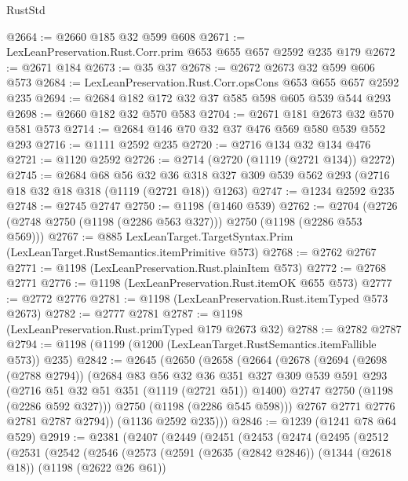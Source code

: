 \begin{lexlean}{RustStd}
\begin{coremodule}
@2664 := @2660 @185 @32 @599 @608
@2671 := LexLeanPreservation.Rust.Corr.prim @653 @655 @657 @2592 @235 @179
@2672 := @2671 @184
@2673 := @35 @37
@2678 := @2672 @2673 @32 @599 @606 @573
@2684 := LexLeanPreservation.Rust.Corr.opsCons @653 @655 @657 @2592 @235
@2694 := @2684 @182 @172 @32 @37 @585 @598 @605 @539 @544 @293
@2698 := @2660 @182 @32 @570 @583
@2704 := @2671 @181 @2673 @32 @570 @581 @573
@2714 := @2684 @146 @70 @32 @37 @476 @569 @580 @539 @552 @293
@2716 := @1111 @2592 @235
@2720 := @2716 @134 @32 @134 @476
@2721 := @1120 @2592
@2726 := @2714 (@2720 (@1119 (@2721 @134)) @2272)
@2745 := @2684
    @68
    @56
    @32
    @36
    @318
    @327
    @309
    @539
    @562
    @293
    (@2716 @18 @32 @18 @318 (@1119 (@2721 @18)) @1263)
@2747 := @1234 @2592 @235
@2748 := @2745 @2747
@2750 := @1198 (@1460 @539)
@2762 := @2704 (@2726 (@2748 @2750 (@1198 (@2286 @563 @327))) @2750 (@1198 (@2286 @553 @569)))
@2767 := @885 LexLeanTarget.TargetSyntax.Prim (LexLeanTarget.RustSemantics.itemPrimitive @573)
@2768 := @2762 @2767
@2771 := @1198 (LexLeanPreservation.Rust.plainItem @573)
@2772 := @2768 @2771
@2776 := @1198 (LexLeanPreservation.Rust.itemOK @655 @573)
@2777 := @2772 @2776
@2781 := @1198 (LexLeanPreservation.Rust.itemTyped @573 @2673)
@2782 := @2777 @2781
@2787 := @1198 (LexLeanPreservation.Rust.primTyped @179 @2673 @32)
@2788 := @2782 @2787
@2794 := @1198 (@1199 (@1200 (LexLeanTarget.RustSemantics.itemFallible @573)) @235)
@2842 := @2645
    (@2650
      (@2658
        (@2664
          (@2678
            (@2694
              (@2698 (@2788 @2794))
              (@2684
                @83
                @56
                @32
                @36
                @351
                @327
                @309
                @539
                @591
                @293
                (@2716 @51 @32 @51 @351 (@1119 (@2721 @51)) @1400)
                @2747
                @2750
                (@1198 (@2286 @592 @327)))
              @2750
              (@1198 (@2286 @545 @598)))
            @2767
            @2771
            @2776
            @2781
            @2787
            @2794))
        (@1136 @2592 @235)))
@2846 := @1239 (@1241 @78 @64 @529)
@2919 := @2381
    (@2407
      (@2449
        (@2451
          (@2453
            (@2474
              (@2495
                (@2512
                  (@2531
                    (@2542
                      (@2546
                        (@2573
                          (@2591
                            (@2635 (@2842 @2846))
                            (@1344 (@2618 @18))
                            (@1198 (@2622 @26 @61))

\end{coremodule}
\end{lexlean}

